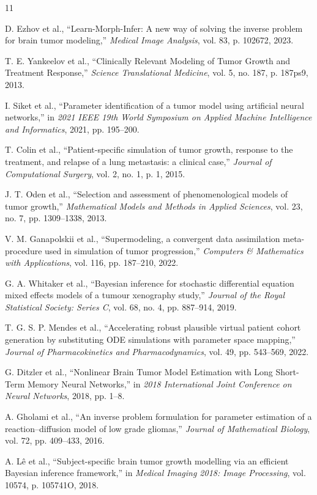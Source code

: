 \documentclass[11pt,a4paper]{article}
\begin{document}
\begin{thebibliography}{11}

D. Ezhov et al., ``Learn-Morph-Infer: A new way of solving the inverse problem for brain tumor modeling,'' \emph{Medical Image Analysis}, vol. 83, p. 102672, 2023.

T. E. Yankeelov et al., ``Clinically Relevant Modeling of Tumor Growth and Treatment Response,'' \emph{Science Translational Medicine}, vol. 5, no. 187, p. 187ps9, 2013.

I. Siket et al., ``Parameter identification of a tumor model using artificial neural networks,'' in \emph{2021 IEEE 19th World Symposium on Applied Machine Intelligence and Informatics}, 2021, pp. 195--200.

T. Colin et al., ``Patient-specific simulation of tumor growth, response to the treatment, and relapse of a lung metastasis: a clinical case,'' \emph{Journal of Computational Surgery}, vol. 2, no. 1, p. 1, 2015.

J. T. Oden et al., ``Selection and assessment of phenomenological models of tumor growth,'' \emph{Mathematical Models and Methods in Applied Sciences}, vol. 23, no. 7, pp. 1309--1338, 2013.

V. M. Ganapolskii et al., ``Supermodeling, a convergent data assimilation meta-procedure used in simulation of tumor progression,'' \emph{Computers \& Mathematics with Applications}, vol. 116, pp. 187--210, 2022.

G. A. Whitaker et al., ``Bayesian inference for stochastic differential equation mixed effects models of a tumour xenography study,'' \emph{Journal of the Royal Statistical Society: Series C}, vol. 68, no. 4, pp. 887--914, 2019.

T. G. S. P. Mendes et al., ``Accelerating robust plausible virtual patient cohort generation by substituting ODE simulations with parameter space mapping,'' \emph{Journal of Pharmacokinetics and Pharmacodynamics}, vol. 49, pp. 543--569, 2022.

G. Ditzler et al., ``Nonlinear Brain Tumor Model Estimation with Long Short-Term Memory Neural Networks,'' in \emph{2018 International Joint Conference on Neural Networks}, 2018, pp. 1--8.

A. Gholami et al., ``An inverse problem formulation for parameter estimation of a reaction--diffusion model of low grade gliomas,'' \emph{Journal of Mathematical Biology}, vol. 72, pp. 409--433, 2016.

A. L\^e et al., ``Subject-specific brain tumor growth modelling via an efficient Bayesian inference framework,'' in \emph{Medical Imaging 2018: Image Processing}, vol. 10574, p. 105741O, 2018.

\end{thebibliography}
\end{document}
